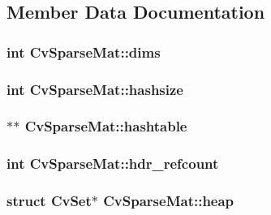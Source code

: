 \subsection{Member Data Documentation}
\hypertarget{structCvSparseMat_ae703789b8f2ef8d757250b888e8c2bf3}{
\subsubsection[{dims}]{\setlength{\rightskip}{0pt plus 5cm}int Cv\-Sparse\-Mat\-::dims}}\label{structCvSparseMat_ae703789b8f2ef8d757250b888e8c2bf3}
\hypertarget{structCvSparseMat_ab506feb5f2501d55b8edd7f13309dfef}{
\subsubsection[{hashsize}]{\setlength{\rightskip}{0pt plus 5cm}int Cv\-Sparse\-Mat\-::hashsize}}\label{structCvSparseMat_ab506feb5f2501d55b8edd7f13309dfef}
\hypertarget{structCvSparseMat_ab8eb73e34a9d3c25d8523122efa770a2}{
\subsubsection[{hashtable}]{$\ast$$\ast$ Cv\-Sparse\-Mat\-::hashtable}}\label{structCvSparseMat_ab8eb73e34a9d3c25d8523122efa770a2}
\hypertarget{structCvSparseMat_abc100a040c983923065fcfac8379f1f1}{
\subsubsection[{hdr\-\_\-refcount}]{\setlength{\rightskip}{0pt plus 5cm}int Cv\-Sparse\-Mat\-::hdr\-\_\-refcount}}\label{structCvSparseMat_abc100a040c983923065fcfac8379f1f1}
\hypertarget{structCvSparseMat_a32660f98736c3bb426df78c43eabdc1b}{
\subsubsection[{heap}]{\setlength{\rightskip}{0pt plus 5cm}struct {\bf Cv\-Set}$\ast$ Cv\-Sparse\-Mat\-::heap}}\label{structCvSparseMat_a32660f98736c3bb426df78c43eabdc1b}
